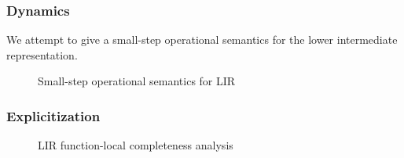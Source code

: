 \documentclass[index.tex]{subfiles}
\begin{document}
\subsubsection{Dynamics}
\label{sec:lir-dynamics}
We attempt to give a small-step operational semantics for the lower intermediate representation.

\begin{figure}
  \caption{Small-step operational semantics for LIR}
  \label{fig:lir-ssos}
\end{figure}

\subsubsection{Explicitization}
\label{sec:explicitization}

\begin{figure}
  \caption{LIR function-local completeness analysis}
  \label{fig:lir-completeness-analysis-local}
\end{figure}
   
\end{document}
